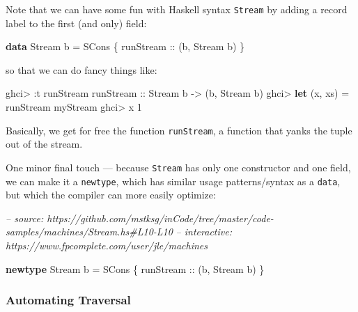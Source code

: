 \documentclass[]{article}
\newenvironment{Shaded}{}{}
\newcommand{\CommentTok}[1]{\textcolor[rgb]{0.38,0.63,0.69}{\textit{#1}}}
\newcommand{\DataTypeTok}[1]{\textcolor[rgb]{0.56,0.13,0.00}{#1}}
\newcommand{\DecValTok}[1]{\textcolor[rgb]{0.25,0.63,0.44}{#1}}
\newcommand{\FunctionTok}[1]{\textcolor[rgb]{0.02,0.16,0.49}{#1}}
\newcommand{\KeywordTok}[1]{\textcolor[rgb]{0.00,0.44,0.13}{\textbf{#1}}}
\newcommand{\NormalTok}[1]{#1}
\newcommand{\OtherTok}[1]{\textcolor[rgb]{0.00,0.44,0.13}{#1}}
\begin{document}
Note that we can have some fun with Haskell syntax \texttt{Stream} by adding a
record label to the first (and only) field:

\begin{Shaded}
\begin{Highlighting}[]
\KeywordTok{data} \DataTypeTok{Stream}\NormalTok{ b }\FunctionTok{=} \DataTypeTok{SCons}\NormalTok{ \{}\OtherTok{ runStream ::}\NormalTok{ (b, }\DataTypeTok{Stream}\NormalTok{ b) \}}
\end{Highlighting}
\end{Shaded}

so that we can do fancy things like:

\begin{Shaded}
\begin{Highlighting}[]
\NormalTok{ghci}\FunctionTok{>} \FunctionTok{:}\NormalTok{t runStream}
\OtherTok{runStream ::} \DataTypeTok{Stream}\NormalTok{ b }\OtherTok{->}\NormalTok{ (b, }\DataTypeTok{Stream}\NormalTok{ b)}
\NormalTok{ghci}\FunctionTok{>} \KeywordTok{let}\NormalTok{ (x, xs) }\FunctionTok{=}\NormalTok{ runStream myStream}
\NormalTok{ghci}\FunctionTok{>}\NormalTok{ x}
\DecValTok{1}
\end{Highlighting}
\end{Shaded}

Basically, we get for free the function \texttt{runStream}, a function that
yanks the tuple out of the stream.

One minor final touch --- because \texttt{Stream} has only one constructor and
one field, we can make it a \texttt{newtype}, which has similar usage
patterns/syntax as a \texttt{data}, but which the compiler can more easily
optimize:

\begin{Shaded}
\begin{Highlighting}[]
\CommentTok{-- source: https://github.com/mstksg/inCode/tree/master/code-samples/machines/Stream.hs#L10-L10}
\CommentTok{-- interactive: https://www.fpcomplete.com/user/jle/machines}

\KeywordTok{newtype} \DataTypeTok{Stream}\NormalTok{ b }\FunctionTok{=} \DataTypeTok{SCons}\NormalTok{ \{}\OtherTok{ runStream ::}\NormalTok{ (b, }\DataTypeTok{Stream}\NormalTok{ b) \}}
\end{Highlighting}
\end{Shaded}

\hypertarget{automating-traversal}{%
\subsubsection{Automating Traversal}\label{automating-traversal}}
\end{document}
